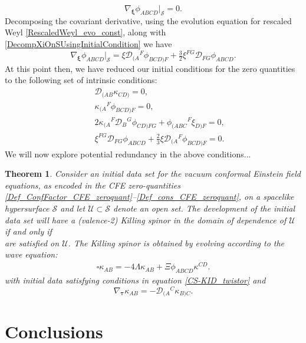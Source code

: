 \documentclass[10pt,a4paper]{article}
\theoremstyle{plain}
\newtheorem{theorem}{Theorem}
\begin{document}
\[ \nabla_{\bm\xi}\phi_{ABCD}\big\vert_{\mathcal{S}}=0.\]
Decomposing the covariant derivative, using the evolution equation for rescaled Weyl \eqref{RescaledWeyl_evo_const}, along with \eqref{DecompXiOnSUsingInitialCondition} we have 
\[ \nabla_{\bm\xi}\phi_{ABCD}\big\vert_{\mathcal{S}} =  \xi \mathcal{D}_{(A}{}^{F}\phi_{BCD)F} + \tfrac{3}{2} \xi^{FG} \mathcal{D}_{FG}\phi_{ABCD}. \]
At this point then, we have reduced our initial conditions for the zero quantities to the following set of intrinsic conditions:
\begin{subequations}
\begin{eqnarray}
    && \mathcal{D}_{(AB}\kappa_{CD)}=0,\\
    && \kappa_{(A}{}^F\phi_{BCD)F}=0,\\
    && 2 \kappa_{(A}{}^{F}\mathcal{D}_{B}{}^{G}\phi_{CD)FG} + \phi_{(ABC}{}^{F}\xi_{D)F} = 0,\\
    && \xi^{FG}\mathcal{D}_{FG}\phi_{ABCD} + \tfrac{2}{3}\xi\mathcal{D}_{(A}{}^F\phi_{BCD)F} = 0.
\end{eqnarray}
\end{subequations}
We will now explore potential redundancy in the above conditions...

\begin{theorem}\label{Theorem_KS}
Consider an initial data set for the vacuum conformal Einstein
field equations, as encoded in the CFE zero-quantities
\eqref{Def_ConfFactor_CFE_zeroquant}--\eqref{Def_cons_CFE_zeroquant},
on a spacelike hypersurface $\mathcal{S}$ and let
$\mathcal{U}\subset\mathcal{S}$ denote an open set.
The development
of the initial data set will have a
(valence-2) Killing spinor in the domain of
dependence of $\mathcal{U}$ if and only if
\\

are satisfied on $\mathcal{U}$. The Killing spinor is obtained by 
evolving according to the wave equation:
\begin{align} \label{Wave_eq_KS_theo}
\square \kappa _{AB} = -4 \Lambda \kappa _{AB} + \Xi \phi_{ABCD}\kappa^{CD}.
\end{align}
with initial data satisfying conditions in equation
\eqref{CS-KID_twistor} and
\begin{equation}
  \nabla_{\bm\tau} \kappa _{AB} = -\mathcal{D} _{(A}{}^C \kappa_{B)C}.
\end{equation}
\end{theorem}


\section*{Conclusions}
\end{document}
